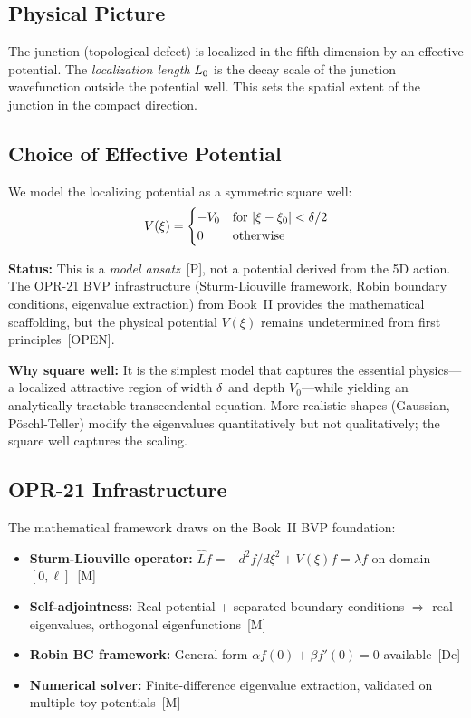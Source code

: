 \subsection{Physical Picture}

The junction (topological defect) is localized in the fifth dimension by an
effective potential. The \emph{localization length} $L_0$ is the decay scale
of the junction wavefunction outside the potential well. This sets the spatial
extent of the junction in the compact direction.

\subsection{Choice of Effective Potential}

We model the localizing potential as a symmetric square well:
\begin{equation}
    V(\xi) = \begin{cases}
        -V_0 & \text{for } |\xi - \xi_0| < \delta/2 \\
        0    & \text{otherwise}
    \end{cases}
    \label{eq:square_well}
\end{equation}

\textbf{Status:} This is a \emph{model ansatz}~[P], not a potential derived from
the 5D action. The OPR-21 BVP infrastructure (Sturm-Liouville framework, Robin
boundary conditions, eigenvalue extraction) from Book~II provides the mathematical
scaffolding, but the physical potential $V(\xi)$ remains undetermined from first
principles~[OPEN].

\textbf{Why square well:} It is the simplest model that captures the essential
physics---a localized attractive region of width $\delta$ and depth $V_0$---while
yielding an analytically tractable transcendental equation. More realistic shapes
(Gaussian, P\"oschl-Teller) modify the eigenvalues quantitatively but not
qualitatively; the square well captures the scaling.

\subsection{OPR-21 Infrastructure}

The mathematical framework draws on the Book~II BVP foundation:
\begin{itemize}
    \item \textbf{Sturm-Liouville operator:}
          $\hat{L}f = -d^2f/d\xi^2 + V(\xi)f = \lambda f$ on domain
          $[0, \ell]$~[M]
    \item \textbf{Self-adjointness:} Real potential + separated boundary
          conditions $\Rightarrow$ real eigenvalues, orthogonal
          eigenfunctions~[M]
    \item \textbf{Robin BC framework:} General form
          $\alpha f(0) + \beta f'(0) = 0$ available~[Dc]
    \item \textbf{Numerical solver:} Finite-difference eigenvalue extraction,
          validated on multiple toy potentials~[M]
\end{itemize}

